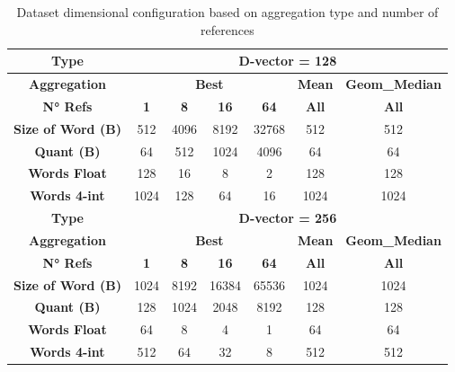 \begin{table}[!h]
    \label{table:word sizes}
    \centering
    \renewcommand{\arraystretch}{1.2}
    \begin{tabular}{|c|cccccc|}
        \hline
        \textbf{Type} & \multicolumn{6}{c|}{\textbf{D-vector = 128}} \\
        \hline
        \textbf{Aggregation} & \multicolumn{4}{c}{\textbf{Best}} & \textbf{Mean} & \textbf{Geom\_Median} \\
        \hline
        \textbf{N° Refs} & \textbf{1} & \textbf{8} & \textbf{16} & \textbf{64} & \textbf{All} & \textbf{All} \\
        \hline 
        \textbf{Size of Word (B)} & 512 & 4096 & 8192 & 32768 & 512 & 512 \\
        \textbf{Quant (B)}        & 64 & 512 & 1024 & 4096 & 64 & 64 \\
        \textbf{Words Float}      & 128 & 16 & 8 & 2 & 128 & 128 \\
        \textbf{Words 4-int}      & 1024 & 128 & 64 & 16 & 1024 & 1024 \\
        \hline
        \textbf{Type} & \multicolumn{6}{c|}{\textbf{D-vector = 256}} \\
        \hline
        \textbf{Aggregation} & \multicolumn{4}{c}{\textbf{Best}} & \textbf{Mean} & \textbf{Geom\_Median} \\
        \hline
        \textbf{N° Refs} & \textbf{1} & \textbf{8} & \textbf{16} & \textbf{64} & \textbf{All} & \textbf{All} \\
        \hline 
        \textbf{Size of Word (B)} & 1024 & 8192 & 16384 & 65536 & 1024 & 1024 \\
        \textbf{Quant (B)}        & 128 & 1024 & 2048 & 8192 & 128 & 128 \\
        \textbf{Words Float}      & 64 & 8 & 4 & 1 & 64 & 64 \\
        \textbf{Words 4-int}      & 512 & 64 & 32 & 8 & 512 & 512 \\
        \hline
    \end{tabular}
    \caption{Dataset dimensional configuration based on aggregation type and number of references}
    \label{table:dataset_dimensions}
\end{table}
